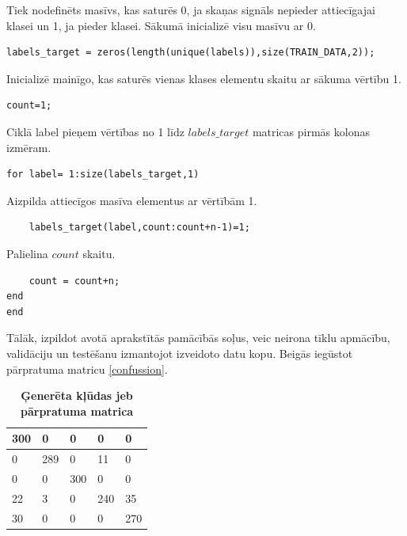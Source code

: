 \documentclass[12pt,paper=A4]{report}
\begin{document}
Tiek nodefinēts masīvs, kas saturēs 0, ja skaņas signāls nepieder attiecīgajai klasei un 1, ja pieder klasei. Sākumā inicializē visu masīvu ar 0.

\begin{lstlisting}
labels_target = zeros(length(unique(labels)),size(TRAIN_DATA,2));
\end{lstlisting}


Inicializē mainīgo, kas saturēs vienas klases elementu skaitu ar sākuma vērtību 1.

\begin{lstlisting}
count=1;
\end{lstlisting}

Ciklā label pieņem vērtības no 1 līdz $labels\_target$ matricas pirmās kolonas izmēram.

\begin{lstlisting}
for label= 1:size(labels_target,1)
\end{lstlisting}


    Aizpilda attiecīgos masīva elementus ar vērtībām 1.

\begin{lstlisting}
    labels_target(label,count:count+n-1)=1;
\end{lstlisting}


Palielina $count$ skaitu.

\begin{lstlisting}
    count = count+n;
end
end
\end{lstlisting} 
 


Tālāk, izpildot avotā \cite{dtw40} aprakstītās pamācībās soļus, veic neirona tīklu apmācību, validāciju un testēšanu izmantojot izveidoto datu kopu. Beigās iegūstot pārpratuma matricu \ref{confussion}. 

\begin{table}
\centering
\caption{}
\captionsetup{justification=centering}
\caption*{\textbf{Ģenerēta kļūdas jeb pārpratuma matrica}}
\begin{tabular}{ | l | l | l | l | l |} 
\hline
300 & 0 & 0 & 0 & 0 \\ 
\hline
0 & 289 & 0 & 11 & 0 \\ 
\hline
0 & 0 & 300 & 0 & 0 \\ 
\hline
22 & 3 & 0 & 240 & 35 \\ 
\hline
30 & 0 & 0 & 0 & 270 \\ 
\hline

\end{tabular}
\label{confusionMatrix}
\end{table}
\end{document}
